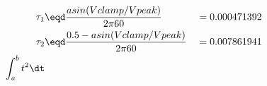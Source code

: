 \begin{align*}
  \tau_1 &\eqd \frac{asin(Vclamp/Vpeak)}
                    {2\pi60} 
         &&= 0.000471392
         \\
  \tau_2 &\eqd \frac{0.5-asin(Vclamp/Vpeak)}
                    {2\pi60}
         && = 0.007861941
  \\
  \int_a^b t^2 \dt
\end{align*}
%
%
%
%
%
%
%
